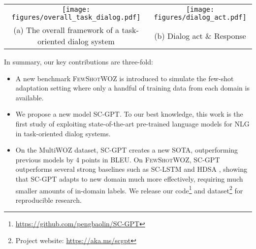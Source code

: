 \documentclass[11pt,a4paper]{article}
\newcommand{\data}{\textsc{FewShotWOZ}}
\begin{document}
\begin{figure*}[t!]
\centering
\begin{tabular}{c c}
	\hspace{-2mm}
	\texttt{[image: figures/overall\_task\_dialog.pdf]}  & 
	 \hspace{-2mm}
	\texttt{[image: figures/dialog\_act.pdf]} \\
	(a) The overall framework of a task-oriented dialog system \vspace{2mm} & 
	\hspace{-2mm}  (b) Dialog act \& Response \hspace{-0mm} \\ 
\end{tabular}

\caption{Illustration of the NLG module in the overall task-oriented dialog system. (a) The NLG module is highlighted with glowing black bounding boxes. (b) One example of dialog act (including intent and slot-value pairs) and its corresponding natural language response. }
\label{fig:dailog_system}
\end{figure*}


In summary, our key contributions are three-fold:
\begin{itemize}
\setlength{\itemsep}{-3pt}
    \item A new benchmark \data{} is introduced to simulate the few-shot adaptation setting where only a handful of training data from each domain is available.
    \item We propose a new model SC-GPT. To our best knowledge, this work is the first study of exploiting state-of-the-art pre-trained language models for NLG in task-oriented dialog systems.
    \item On the MultiWOZ dataset, SC-GPT creates a new SOTA, outperforming previous models by 4 points in BLEU. 
     On \data{}, SC-GPT outperforms several strong baselines such as SC-LSTM and HDSA \citep{chen-etal-2019-semantically}, showing that SC-GPT adapts to new domain much more effectively, requiring much smaller amounts of in-domain labels.
     We release our code\footnote{\url{https://github.com/pengbaolin/SC-GPT}} and dataset\footnote{Project website: \url{https://aka.ms/scgpt}} for reproducible research.
\end{itemize}
\end{document}

